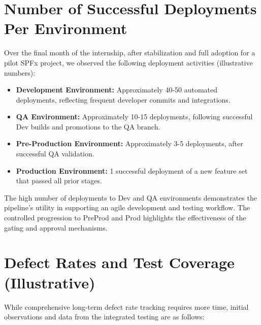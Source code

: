 \section{Number of Successful Deployments Per Environment}
\label{sec:SuccessfulDeployments}

Over the final month of the internship, after stabilization and full adoption for a pilot SPFx project, we observed the following deployment activities (illustrative numbers):

\begin{itemize}
    \item \textbf{Development Environment:} Approximately 40-50 automated deployments, reflecting frequent developer commits and integrations.
    \item \textbf{QA Environment:} Approximately 10-15 deployments, following successful Dev builds and promotions to the QA branch.
    \item \textbf{Pre-Production Environment:} Approximately 3-5 deployments, after successful QA validation.
    \item \textbf{Production Environment:} 1 successful deployment of a new feature set that passed all prior stages.
\end{itemize}

The high number of deployments to Dev and QA environments demonstrates the pipeline's utility in supporting an agile development and testing workflow. The controlled progression to PreProd and Prod highlights the effectiveness of the gating and approval mechanisms.

\section{Defect Rates and Test Coverage (Illustrative)}
\label{sec:DefectRatesTestCoverage}

While comprehensive long-term defect rate tracking requires more time, initial observations and data from the integrated testing are as follows:

